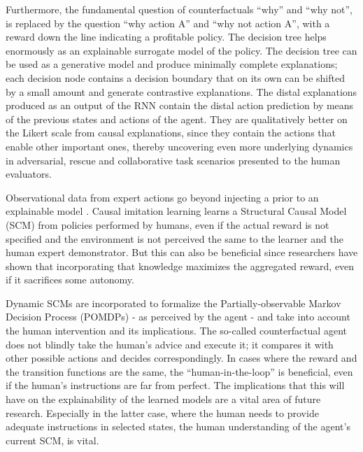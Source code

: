 \documentclass[twoside,11pt]{article}
\begin{document}
Furthermore, the fundamental question of counterfactuals ``why'' and ``why not'', is replaced by the question ``why action A'' and ``why not action A'', with a reward down the line indicating a profitable policy. The decision tree helps enormously as an explainable surrogate model of the policy. The decision tree can be used as a generative model and produce minimally complete explanations; each decision node contains a decision boundary that on its own can be shifted by a small amount and generate contrastive explanations. The distal explanations produced as an output of the RNN contain the distal action prediction by means of the previous states and actions of the agent. They are qualitatively better on the Likert scale \cite{Hoffman:2018:MetricsXAI} from causal explanations, since they contain the actions that enable other important ones, thereby uncovering even more underlying dynamics in adversarial, rescue and collaborative task scenarios presented to the human evaluators.

Observational data from expert actions go beyond injecting a prior to an explainable model \cite{Zhang:2020:CausalImitationLearning}. Causal imitation learning learns a Structural Causal Model (SCM) \cite{Pearl:2000:ModelsReasoningInference} from policies performed by humans, even if the actual reward is not specified and the environment is not perceived the same to the learner and the human expert demonstrator. But this can also be beneficial since researchers have shown that incorporating that knowledge maximizes the aggregated reward, even if it sacrifices some autonomy. 

Dynamic SCMs are incorporated to formalize the Partially-observable Markov Decision Process (POMDPs) \cite{SuttonBarto:2018:RLIntroduction} - as perceived by the agent - and take into account the human intervention and its implications. The so-called counterfactual agent does not blindly take the human's advice and execute it; it compares it with other possible actions and decides correspondingly. In cases where the reward and the transition functions are the same, the ``human-in-the-loop'' is beneficial, even if the human's instructions are far from perfect. The implications that this will have on the explainability of the learned models are a vital area of future research. Especially in the latter case, where the human needs to provide adequate instructions in selected states, the human understanding of the agent's current SCM, is vital.  
\end{document}
